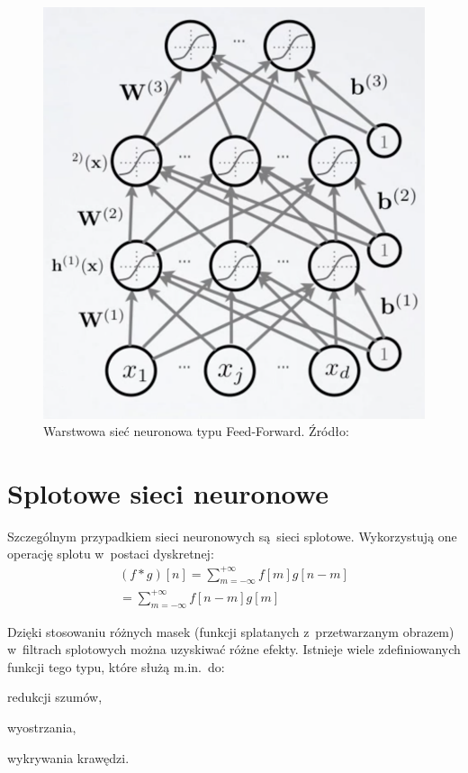 \documentclass[oneside, 11pt, a4paper]{article}
\begin{document}
\begin{multicols}{2}
\begin{figure}[H]
	\includegraphics[width=\linewidth]{img/feed_forward_neural_network.png}
	\vspace{-3mm}
	\caption{Warstwowa sieć neuronowa typu Feed-Forward. Źródło: \cite{feed-forward-net-source}}
	\label{fig:feed-forward-net}
\end{figure}

\section{Splotowe sieci neuronowe}
Szczególnym przypadkiem sieci neuronowych są~sieci splotowe. Wykorzystują one operację splotu w~postaci dyskretnej:
\begin{align*}
(f \ast g)[n] = \sum\limits_{m=-\infty}^{+\infty}f[m]g[n-m]\\
=\sum\limits_{m=-\infty}^{+\infty}f[n-m]g[m]
\end{align*}

Dzięki stosowaniu różnych masek (funkcji splatanych z~przetwarzanym obrazem) w~filtrach splotowych można uzyskiwać różne efekty. Istnieje wiele zdefiniowanych funkcji tego typu, które służą m.in.~do:
\begin{compactitem}
	\item redukcji szumów,
	\item wyostrzania,
	\item wykrywania krawędzi.
\end{compactitem}


\end{multicols}
\end{document}
